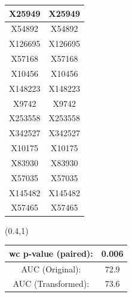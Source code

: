 \documentclass{beamer}
\begin{document}
\begin{frame}
\begin{textblock*}{\paperwidth}
\begin{tabular}{| c c |}
X25949  &  X25949 \\ \hline 
X54892  &  X54892 \\ \hline 
X126695  &  X126695 \\ \hline 
X57168  &  X57168 \\ \hline 
X10456  &  X10456 \\ \hline 
X148223  &  X148223 \\ \hline 
X9742  &  X9742 \\ \hline 
X253558  &  X253558 \\ \hline 
X342527  &  X342527 \\ \hline 
X10175  &  X10175 \\ \hline 
X83930  &  X83930 \\ \hline 
X57035  &  X57035 \\ \hline 
X145482  &  X145482 \\ \hline 
X57465  &  X57465 \\ \hline 
    \end{tabular}
    \hspace{.5em}
  \end{textblock*}
  \begin{textblock*}{\paperwidth}(0.4\textwidth,1\textheight)
    \raggedright 
    \tiny
    \begin{tabular}{| c c |}
      \hline
      wc p-value (paired): & 0.006 \\ \hline
AUC (Original): & 72.9 \\ \hline
AUC (Transformed): & 73.6 \\ \hline
    \end{tabular}
    \hspace{.5em}
  \end{textblock*}
\end{frame}
\end{document}
